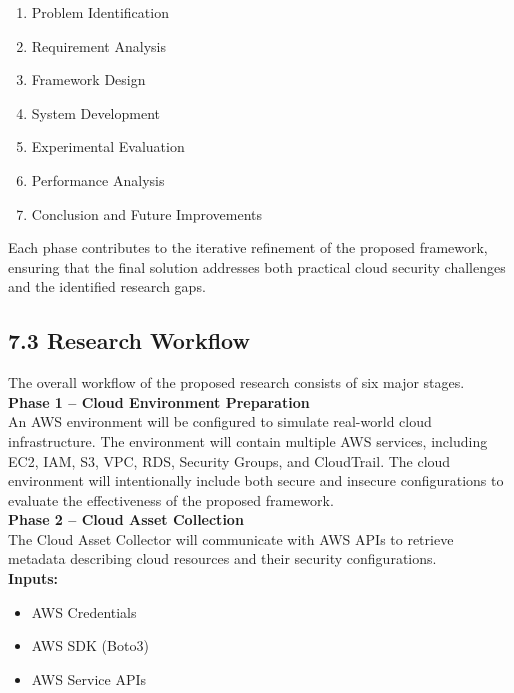 \begin{enumerate}
\def\labelenumi{\arabic{enumi}.}
\tightlist
\item
  Problem Identification\\
\item
  Requirement Analysis\\
\item
  Framework Design\\
\item
  System Development\\
\item
  Experimental Evaluation\\
\item
  Performance Analysis\\
\item
  Conclusion and Future Improvements
\end{enumerate}

Each phase contributes to the iterative refinement of the proposed framework, ensuring that the final solution addresses both practical cloud security challenges and the identified research gaps.

\subsection{7.3 Research Workflow}

The overall workflow of the proposed research consists of six major stages.\\
\textbf{Phase 1 -- Cloud Environment Preparation}\\
An AWS environment will be configured to simulate real-world cloud infrastructure. The environment will contain multiple AWS services, including EC2, IAM, S3, VPC, RDS, Security Groups, and CloudTrail. The cloud environment will intentionally include both secure and insecure configurations to evaluate the effectiveness of the proposed framework.\\
\textbf{Phase 2 -- Cloud Asset Collection}\\
The Cloud Asset Collector will communicate with AWS APIs to retrieve metadata describing cloud resources and their security configurations.\\
\textbf{Inputs:}

\begin{itemize}
\tightlist
\item
  AWS Credentials\\
\item
  AWS SDK (Boto3)\\
\item
  AWS Service APIs
\end{itemize}

